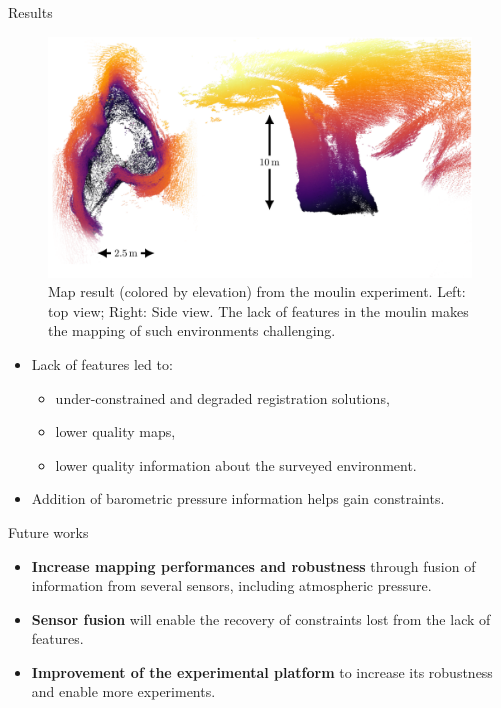 \documentclass[final,hyperref={pdfpagelabels=false}]{beamer}
\begin{document}
\begin{frame}[t]
\begin{columns}[t]
\begin{column}{.465\textwidth}
\begin{block}{Results}
\begin{figure}
\includegraphics[width=1.0\linewidth]{figures/moulin2.pdf}%
\vspace{-7mm}
\caption{Map result (colored by elevation) from the moulin experiment. Left: top view; Right: Side view. The lack of features in the moulin makes the mapping of such environments challenging.}
\label{fig:3D-map}
\end{figure}
\begin{itemize}
	\item Lack of features led to: 
	\begin{itemize}
		\item under-constrained and degraded registration solutions,
		\item lower quality maps,
		\item lower quality information about the surveyed environment.
	\end{itemize}
	\item Addition of barometric pressure information helps gain constraints.
\end{itemize}
\end{block}


\begin{block}{Future works}
	\begin{itemize}
		\item \textbf{Increase mapping performances and robustness} through fusion of information from several sensors, including atmospheric pressure.
		\item \textbf{Sensor fusion} will enable the recovery of constraints lost from the lack of features.
		\item \textbf{Improvement of the experimental platform} to increase its robustness and enable more experiments.
	\end{itemize}
\end{block}


\end{column}
\end{columns}
\end{frame}
\end{document}
